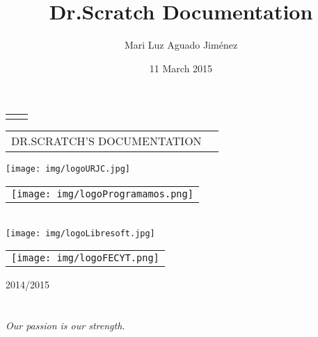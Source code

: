 \documentclass[a4paper, 12pt]{book}
\title{Dr.Scratch Documentation}
\author{Mari Luz Aguado Jiménez}
\date{11 March 2015}
\begin{document}
\renewcommand{\appendixname}{Apéndice}

\begin{titlepage}
\begin{center}

\begin{tabular}[c]{c c}
\vspace{2cm}
\end{tabular}



\begin{tabular}[c]{c c}
\Huge
DR.SCRATCH'S DOCUMENTATION
\end{tabular}

\vspace{6cm}

\texttt{[image: img/logoURJC.jpg]}
\begin{tabular}[b]{l}
\texttt{[image: img/logoProgramamos.png]} 
\end{tabular}
\\
\texttt{[image: img/logoLibresoft.jpg]}
\begin{tabular}[b]{l}
\texttt{[image: img/logoFECYT.png]} 
\end{tabular}


\vspace{2.5cm}

\vspace{4cm}

\large
2014/2015
\end{center}
\end{titlepage}

\newpage
\mbox{}
\thispagestyle{empty} %

\chapter*{}
\begin{flushright}
\textit{Our passion is our strength.}
\end{flushright}


\tableofcontents  %
\cleardoublepage
\listoffigures %
\end{document}

